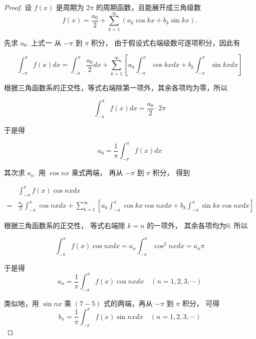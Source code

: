 \begin{proof}
    设 $ f(x) $ 是周期为 $ 2 \pi $ 的周期函数，且能展开成三角级数
\begin{equation}
f(x)=\frac{a_{0}}{2}+\sum_{k=1}^{\infty}\left(a_{k} \cos k x+b_{k} \sin k x\right) .
\end{equation}

先求 $ a_{0} $. 上式一 从 $ -\pi $ 到 $ \pi $ 积分， 由于假设式右端级数可逐项积分，因此有

\begin{equation} \int_{-\pi}^{\pi} f(x) {d} x=\int_{-\pi}^{\pi} \frac{a_{0}}{2} {d} x+\sum_{k=1}^{\infty}\left[a_{k} \int_{-\pi}^{\pi} \cos k x {d} x+b_{k} \int_{-\pi}^{\pi} \sin k x {d} x\right] \end{equation}

根据三角函数系的正交性，等式右端除第一项外，其余各项均为零，所以

\begin{equation} \int_{-\pi}^{\pi} f(x) {d} x=\frac{a_{0}}{2} \cdot 2 \pi \end{equation}

于是得

\begin{equation} a_{0}=\frac{1}{\pi} \int_{-\pi}^{\pi} f(x) {d} x \end{equation}

其次求 $ a_{n} . $ 用 $ \cos n x $ 乘式两端， 再从 $ -\pi $ 到 $ \pi $ 积分， 得到

\begin{equation} \begin{aligned}  &\int_{-\pi}^{\pi} f(x) \cos n x {d} x\\ =&\frac{a_{0}}{2} \int_{-\pi}^{\pi} \cos n x {d} x+\sum_{k=1}^{\infty}\left[a_{k} \int_{-\pi}^{\pi} \cos k x \cos n x {d} x+b_{k} \int_{-\pi}^{\pi} \sin k x \cos n x {d} x\right] \end{aligned} \end{equation}

根据三角函数系的正交性， 等式右端除 $ k=n $ 的一项外， 其余各项均为0. 所以

\begin{equation} \int_{-\pi}^{\pi} f(x) \cos n x {d} x=a_{n} \int_{-\pi}^{\pi} \cos ^{2} n x {d} x=a_{n} \pi \end{equation}

于是得\begin{equation} a_{n}=\frac{1}{\pi} \int_{-\pi}^{\pi} f(x) \cos n x {d} x \quad(n=1,2,3, \cdots) \end{equation}

类似地，用 $ \sin n x $ 乘 $ (7-5) $ 式的两端，再从 $ -\pi $ 到 $ \pi $ 积分， 可得
\begin{equation}
b_{n}=\frac{1}{\pi} \int_{-\pi}^{\pi} f(x) \sin n x {d} x \quad(n=1,2,3, \cdots)
\end{equation}
\end{proof}

